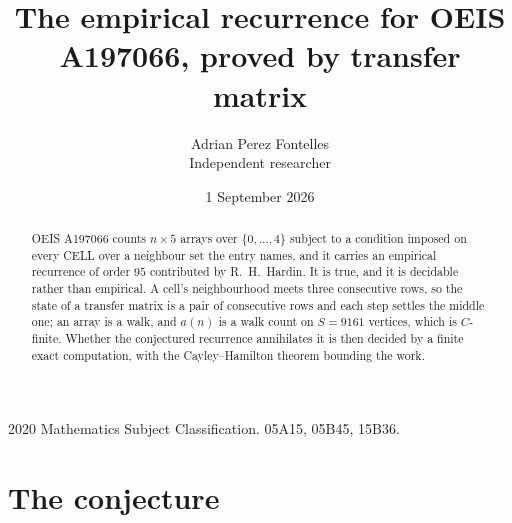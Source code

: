\documentclass[11pt,a4paper]{article}
\title{The empirical recurrence for OEIS A197066, proved by transfer matrix}
\author{Adrian Perez Fontelles\\ \small Independent researcher}
\date{1 September 2026}
\theoremstyle{plain}
\theoremstyle{definition}
\begin{document}
\maketitle

\begin{abstract}
OEIS A197066 counts $n\times5$ arrays over $\{0,\dots,4\}$ subject to a condition imposed on
every CELL over a neighbour set the entry names, and it carries an empirical recurrence of
order $95$ contributed by R.~H.~Hardin. It is true, and it is decidable rather than
empirical. A cell's neighbourhood meets three consecutive rows, so the state of a transfer
matrix is a pair of consecutive rows and each step settles the middle one; an array is a
walk, and $a(n)$ is a walk count on $S=9161$ vertices, which is $C$-finite. Whether the
conjectured recurrence annihilates it is then decided by a finite exact computation, with the
Cayley--Hamilton theorem bounding the work.
\end{abstract}

\noindent\small 2020 Mathematics Subject Classification. 05A15, 05B45, 15B36.\normalsize

\section{The conjecture}
\end{document}
